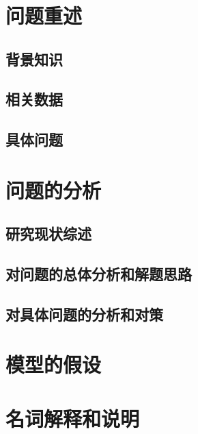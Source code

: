 \documentclass[withoutpreface,bwprint]{cumcmthesis} %
\title{ }
\begin{document}
	\maketitle
 	\begin{abstract}


	\keywords{}
	\end{abstract}




\tableofcontents
\newpage

\section{问题重述}
	\subsection{背景知识}

	\subsection{相关数据}

	\subsection{具体问题}


\section{问题的分析}
	\subsection{研究现状综述}

	\subsection{对问题的总体分析和解题思路}

	\subsection{对具体问题的分析和对策}

\section{模型的假设}

\section{名词解释和说明}
\end{document}

